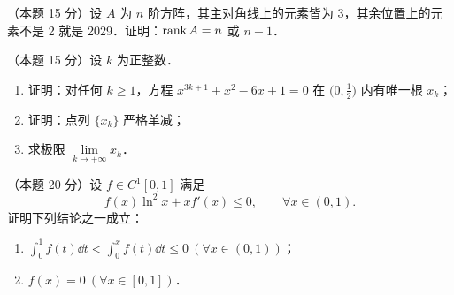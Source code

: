 \begin{problems}
\item[四、]（本题 15 分）设 $A$ 为 $n$ 阶方阵，其主对角线上的元素皆为 3，其余位置上的元素不是 2 就是 2029．证明：$\operatorname{rank} A=n$ 或 $n-1$．

\item[五、]（本题 15 分）设 $k$ 为正整数．
\begin{enumerate}[label=(\arabic*)]
  \item 证明：对任何 $k\geqslant 1$，方程 $x^{3k+1}+x^2-6x+1=0$ 在 $\bigl(0,\frac{1}{2}\bigr)$ 内有唯一根 $x_k$；
  \item 证明：点列 $\{x_k\}$ 严格单减；
  \item 求极限 $\lim\limits_{k\to+\infty}x_k$．
\end{enumerate}

\item[六、]（本题 20 分）设 $f\in C^1[0,1]$ 满足
\[
  f(x)\ln^2 x+xf'(x)\leqslant 0,\qquad \forall x\in(0,1).
\]
证明下列结论之一成立：
\begin{enumerate}[label=(\arabic*)]
  \item $\displaystyle\int_0^1 f(t)\dd t<\int_0^x f(t)\dd t\leqslant 0\ (\forall x\in(0,1))$；
  \item $f(x)=0\ (\forall x\in[0,1])$．
\end{enumerate}

\end{problems}
